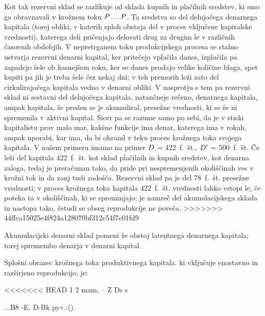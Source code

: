 \documentclass[kapital_02.tex]{subfiles}
\begin{document}
Kot tak rezervni sklad se razlikuje od sklada kupnih in plačilnih sredstev, ki smo ga obravnavali v krožnem toku \( P \dots P \). Ta sredstva so del delujočega denarnega kapitala (torej obliki, v katerih sploh obstaja del v proces vključene kapitalske vrednosti), katerega deli pričenjajo delovati drug za drugim le v različnih časovnih obdobjih. V nepretrganem toku produkcijskega procesa se stalno ustvarja rezervni \KPEstran denarni kapital, ker pritečejo vplačila danes, izplačila pa zapadejo šele ob kasnejšem roku, ker se danes prodajo velike količine blaga, spet kupiti pa jih je treba šele čez nekaj dni; v teh premorih leži zato del cirkulirajočega kapitala vedno v denarni obliki. V nasprotju s tem pa rezervni sklad ni sestavni del delujočega kapitala, natančneje rečeno, denarnega kapitala, ampak kapitala, še preden se je akumuliral, presežne vrednosti, ki se še ni spremenila v aktivni kapital. Sicer pa se razume samo po sebi, da je v stiski kapitalistu prav malo mar, kakšne funkcije ima denar, katerega ima v rokah, ampak uporabi, kar ima, da bi ohranil v teku proces krožnega toka svojega kapitala. V našem primeru imamo na primer \( D \) = 422~f.~št., \( D' \) = 500~f.~št. Če leži del kapitala 422~f.~št. kot sklad plačilnih in kupnih sredstev, kot denarna zaloga, tedaj je preračunan tako, da pride pri nespremenjenih okoliščinah ves v krožni tok in da zanj tudi zadošča. Rezervni sklad pa je del 78~f.~št. presežne vrednosti; v proces krožnega toka kapitala 422~f.~št. vrednosti lahko vstopi le, če poteka ta v okoliščinah, ki se spreminjajo; je namreč del akumulacijskega sklada in nastopa tako, četudi se obseg reprodukcije ne poveča.
>>>>>>> 44ffca15025e4f824a128070bf312c54f7c01fd9

Akumulacijski denarni sklad pomeni že obstoj latentnega denarnega kapitala; torej spremembo denarja v denarni kapital.

Splošni obrazec krožnega toka produktivnega kapitala. ki vključuje enostavno in razširjeno reprodukcijo, je:

<<<<<<< HEAD
1 2 mam, -- Z Ds s

\KPEP...B8 -E. D-Bk py«.:\KPEP (\KPEP).
\end{document}
